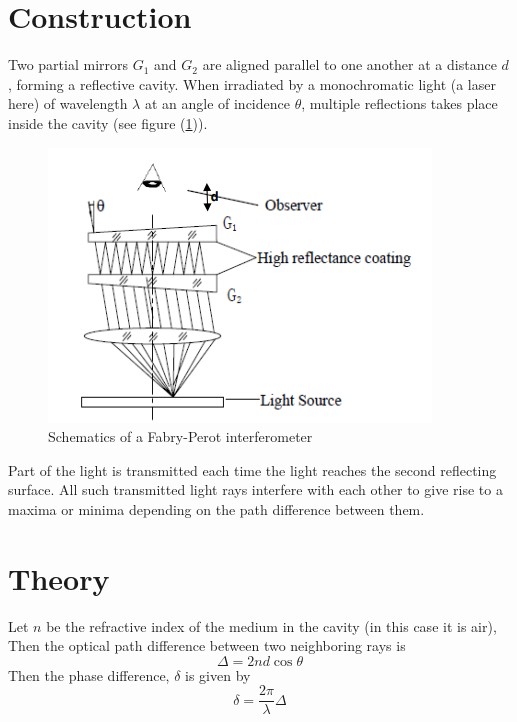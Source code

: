 \documentclass{article}
\begin{document}
\section{Construction}
\noindent
Two partial mirrors $G_1$ and $G_2$ are aligned parallel to one another at a distance $d$, forming a reflective cavity. When irradiated by a monochromatic light (a laser here) of wavelength $\lambda$ at an angle of incidence $\theta$, multiple reflections takes place inside the cavity (see figure (\ref{fig:schematics})).

\begin{figure}[h!]
    \centering
    \includegraphics{Figures/schematics.png}
    \caption{Schematics of a Fabry-Perot interferometer}
    \label{fig:schematics}
\end{figure}
\par
\noindent
Part of the light is transmitted each time the light reaches the second reflecting surface. All such transmitted light rays interfere with each other to give rise to a maxima or minima depending on the path difference between them.


\section{Theory}
\noindent Let $n$ be the refractive index of the medium in the cavity (in this case it is air), Then the optical path difference between two neighboring rays is
\begin{equation}
    \label{eq1}
    \Delta = 2 n d \cos \theta
\end{equation}
Then the phase difference, $\delta$ is given by
\begin{equation}
    \delta = \frac{2 \pi}{\lambda} \Delta
\end{equation}
\end{document}

